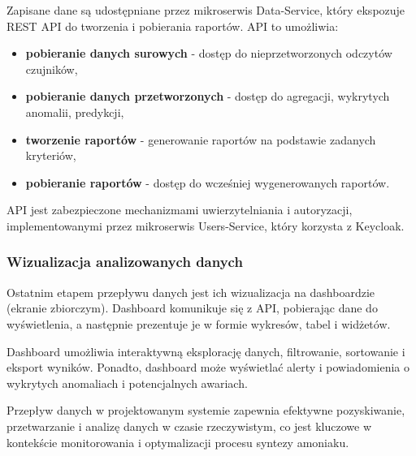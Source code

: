 Zapisane dane są udostępniane przez mikroserwis Data-Service, który ekspozuje REST API do tworzenia i pobierania raportów. API to umożliwia:

\begin{itemize}
    \item \textbf{pobieranie danych surowych} - dostęp do nieprzetworzonych odczytów czujników,
    \item \textbf{pobieranie danych przetworzonych} - dostęp do agregacji, wykrytych anomalii, predykcji,
    \item \textbf{tworzenie raportów} - generowanie raportów na podstawie zadanych kryteriów,
    \item \textbf{pobieranie raportów} - dostęp do wcześniej wygenerowanych raportów.
\end{itemize}

API jest zabezpieczone mechanizmami uwierzytelniania i autoryzacji, implementowanymi przez mikroserwis Users-Service, który korzysta z Keycloak.

\subsubsection{Wizualizacja analizowanych danych}
\label{subsubsec:wizualizacja_danych}

Ostatnim etapem przepływu danych jest ich wizualizacja na dashboardzie (ekranie zbiorczym). Dashboard komunikuje się z API, pobierając dane do wyświetlenia, a następnie prezentuje je w formie wykresów, tabel i widżetów.

Dashboard umożliwia interaktywną eksplorację danych, filtrowanie, sortowanie i eksport wyników. Ponadto, dashboard może wyświetlać alerty i powiadomienia o wykrytych anomaliach i potencjalnych awariach.

Przepływ danych w projektowanym systemie zapewnia efektywne pozyskiwanie, przetwarzanie i analizę danych w czasie rzeczywistym, co jest kluczowe w kontekście monitorowania i optymalizacji procesu syntezy amoniaku. 